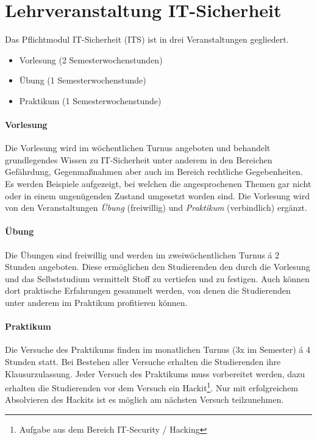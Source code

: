 \section{Lehrveranstaltung IT-Sicherheit} \label{sec:Lehrveranstaltung_IT-Sicherheit}

Das Pflichtmodul IT-Sicherheit (ITS) ist in drei Veranstaltungen gegliedert.\cite[S.30]{hochschuleniederrheinModulhandbuchVollzeitBA2019}
\begin{itemize}
	\item Vorlesung (2 Semesterwochenstunden)
	\item Übung (1 Semesterwochenstunde)
	\item Praktikum (1 Semesterwochenstunde)
\end{itemize}

\paragraph{Vorlesung}\label{para:Vorlesung}
Die Vorlesung wird im wöchentlichen Turnus angeboten und behandelt grundlegendes Wissen zu IT-Sicherheit unter anderem in den Bereichen Gefährdung, Gegenmaßnahmen aber auch im Bereich rechtliche Gegebenheiten. Es werden Beispiele aufgezeigt, bei welchen die angesprochenen Themen gar nicht oder in einem ungenügenden Zustand umgesetzt worden sind. Die Vorlesung wird von den Veranstaltungen \textit{Übung} (freiwillig) und \textit{Praktikum} (verbindlich) ergänzt.

\paragraph{Übung}\label{para:Übung}
Die Übungen sind freiwillig und werden im zweiwöchentlichen Turnus á 2 Stunden angeboten. Diese ermöglichen den Studierenden den durch die Vorlesung und das Selbststudium vermittelt Stoff zu vertiefen und zu festigen. Auch können dort praktische Erfahrungen gesammelt werden, von denen die Studierenden unter anderem im Praktikum profitieren können.

\paragraph{Praktikum}\label{para:Praktikum}
Die Versuche des Praktikums finden im monatlichen Turnus (3x im Semester) á 4 Stunden statt. Bei Bestehen aller Versuche erhalten die Studierenden ihre Klausurzulassung. Jeder Versuch des Praktikums muss vorbereitet werden, dazu erhalten die Studierenden vor dem Versuch ein Hackit\footnote{Aufgabe aus dem Bereich IT-Security / Hacking}. Nur mit erfolgreichem Absolvieren des Hackits ist es möglich am nächsten Versuch teilzunehmen.\cite{quadePraktikumITSecurity2017}